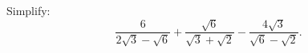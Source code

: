 Simplify:
\[
\dfrac{6}{2\sqrt{3}-\sqrt{6}}+\dfrac{\sqrt{6}}{\sqrt{3}+\sqrt{2}}-\dfrac{4\sqrt{3}}{\sqrt{6}-\sqrt{2}} .
\]
